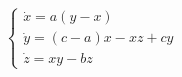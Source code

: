 \documentclass[preview,border=4pt]{standalone}
\begin{document}
\begin{equation}
\begin{cases}
\dot{x} = a (y - x) \\
\dot{y} = (c - a)x - xz + cy \\
\dot{z} = xy - bz
\end{cases}
\end{equation}
\end{document}

